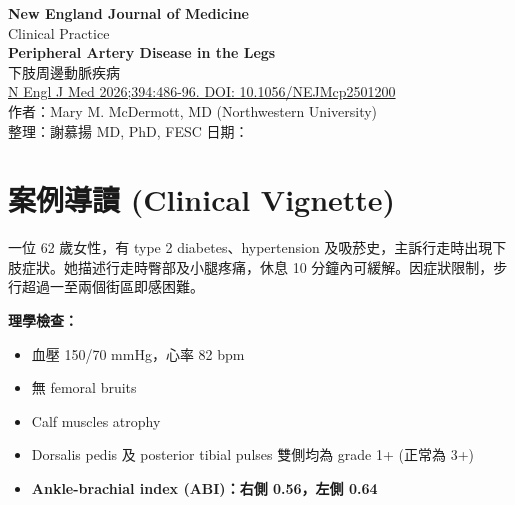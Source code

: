 \documentclass[12pt,a4paper]{article}
\begin{document}
\begin{center}
{\LARGE\bfseries\textcolor{emergency_red}{New England Journal of Medicine}}\\[0.3cm]
{\Large\textcolor{emergency_blue}{Clinical Practice}}\\[0.5cm]
{\Large\textbf{Peripheral Artery Disease in the Legs}}\\[0.3cm]
{\large 下肢周邊動脈疾病}\\[0.5cm]
{\normalsize \href{https://doi.org/10.1056/NEJMcp2501200}{N Engl J Med 2026;394:486-96. DOI: 10.1056/NEJMcp2501200}}\\[0.3cm]
{\normalsize 作者：Mary M. McDermott, MD (Northwestern University)}\\[0.3cm]
{\normalsize 整理：謝慕揚 MD, PhD, FESC \quad 日期：\mydate}
\end{center}

\vspace{0.5cm}

\section{案例導讀 (Clinical Vignette)}

一位 62 歲女性，有 type 2 diabetes、hypertension 及吸菸史，主訴行走時出現下肢症狀。她描述行走時臀部及小腿疼痛，休息 10 分鐘內可緩解。因症狀限制，步行超過一至兩個街區即感困難。

\textbf{理學檢查：}
\begin{itemize}[leftmargin=2em]
    \item 血壓 150/70 mmHg，心率 82 bpm
    \item 無 femoral bruits
    \item Calf muscles atrophy
    \item Dorsalis pedis 及 posterior tibial pulses 雙側均為 grade 1+ (正常為 3+)
    \item \textbf{Ankle-brachial index (ABI)：右側 0.56，左側 0.64}
\end{itemize}


\end{document}
